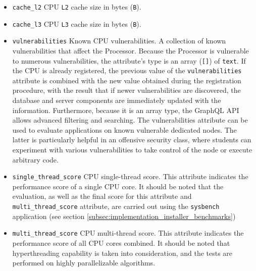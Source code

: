 \begin{itemize}
  \item \texttt{cache\_l2}
    \newline
    CPU \texttt{L2} cache size in bytes (\texttt{B}).

  \item \texttt{cache\_l3}
    \newline
    CPU \texttt{L3} cache size in bytes (\texttt{B}).

  \item \texttt{vulnerabilities}
    \newline
    Known CPU vulnerabilities.
    \newline
    A collection of known vulnerabilities that affect the Processor.
    \newline
    Because the Processor is vulnerable to numerous vulnerabilities, the attribute's
    type is an array (\texttt{[]}) of \texttt{text}. If the CPU is already registered,
    the previous value of the \texttt{vulnerabilities} attribute is combined with
    the new value obtained during the registration procedure, with the result
    that if newer vulnerabilities are discovered, the database and server components
    are immediately updated with the information. Furthermore, because it is an array
    type, the GraphQL API allows advanced filtering and searching.
    \newline
    The vulnerabilities attribute can be used to evaluate applications on known vulnerable
    dedicated nodes. The latter is particularly helpful in an offensive security
    class, where students can experiment with various vulnerabilities to take control
    of the node or execute arbitrary code.

  \item \texttt{single\_thread\_score}
    \newline
    CPU single-thread score.
    \newline
    This attribute indicates the performance score of a single CPU core.
    \newline
    It should be noted that the evaluation, as well as the final score for this attribute
    and \texttt{multi\_thread\_score} attribute, are carried out using the \texttt{sysbench}
    application (see section \ref{subsec:implementation_installer_benchmarks})

  \item \texttt{multi\_thread\_score}
    \newline
    CPU multi-thread score.
    \newline
    This attribute indicates the performance score of all CPU cores combined.
    \newline
    It should be noted that hyperthreading capability is taken into
    consideration, and the tests are performed on highly parallelizable algorithms.


\end{itemize}

